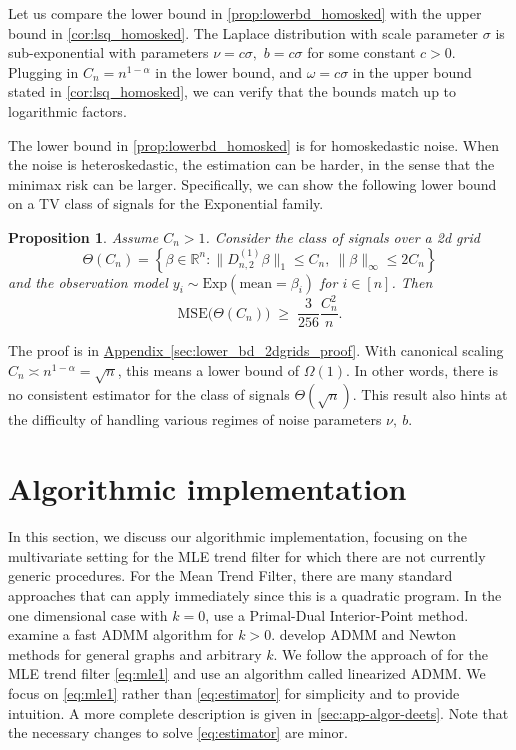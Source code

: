 \documentclass[ejs,noshowframe]{imsart}
\theoremstyle{plain}
\newtheorem{proposition}[theorem]{Proposition}
\theoremstyle{definition}
\newcommand{\aref}[1]{\hyperref[#1]{Appendix~\ref*{#1}}}
\newcommand{\R}{\mathbb{R}}
\newcommand{\E}{E}
\renewcommand{\hat}{\widehat}
\newcommand{\ktfmat}{D}
\begin{document}
Let us compare the lower bound in  \autoref{prop:lowerbd_homosked} with
the upper 
bound in 
\autoref{cor:lsq_homosked}.
The Laplace distribution with scale parameter $\sigma$ is sub-exponential with
parameters  
$\nu = c\sigma,$ $b = c\sigma$ for some constant $c>0$.
Plugging in $C_n = n^{1-\alpha}$ in the lower bound, and $\omega=c\sigma$ in the
upper bound  
stated in \autoref{cor:lsq_homosked},  we can verify that the bounds match 
up to logarithmic factors.


The lower bound in  \autoref{prop:lowerbd_homosked} is for homoskedastic noise. 
When the noise is heteroskedastic, the estimation can be harder, in the sense 
that the minimax risk can be larger.
Specifically, we can show the following lower bound on a TV class of signals 
for the Exponential family.
\begin{proposition}
\label{prop:lower_bd_2dgrids}
Assume $C_n > 1$. Consider the class of signals over a 2d grid
\begin{equation}
\Theta(C_n) 
	= \left\{ \beta \in 
		\R^n : 
	\| \ktfmat_{n,2}^{(1)} \beta \|_1 \leq C_n, \ 
	\|\beta\|_\infty \leq 2C_n
	\right\}
\end{equation}
and the observation model $y_i \sim \mathrm{Exp}(\mathrm{mean} = 
\beta_i)$ for $i\in[n]$. Then
\begin{equation}
  \mathrm{MSE}\big( \Theta(C_n) \big)
  \;\geq \;
  \frac{3}{256} \frac{C_n^2}{n}.
\end{equation}
\end{proposition}
\noindent
The proof is in \aref{sec:lower_bd_2dgrids_proof}.
With canonical scaling $C_n \asymp n^{1-\alpha} = \sqrt{n}$, this means a lower
bound of $\Omega(1)$. 
In other words, there is no consistent estimator for the class of signals
$\Theta(\sqrt{n})$.  
This result also hints at the difficulty of handling various regimes of noise
parameters $\nu,\ b.$ 

\section{Algorithmic implementation}
\label{sec:algor-impl}

In this section, we discuss our algorithmic implementation, focusing on the
multivariate setting for the MLE trend filter for which there are not currently
generic procedures. 
For the Mean Trend Filter, there are many standard approaches that can apply
immediately since this is a quadratic program. In the one dimensional case with
$k=0$, \citet{KimKoh2009} use 
a Primal-Dual Interior-Point method. \citet{RamdasTibshirani2016} examine a fast
ADMM algorithm for $k>0$. \citet{WangSharpnack2016} develop ADMM and Newton
methods for general graphs and arbitrary $k$. We follow the approach of
\citet{KhodadadiMcDonald2018} for the MLE trend filter 
\eqref{eq:mle1} and use an
algorithm called linearized ADMM. We focus on \eqref{eq:mle1} rather than
\eqref{eq:estimator} for simplicity and to provide intuition. A more complete
description is given in 
\autoref{sec:app-algor-deets}. Note that the necessary changes to solve
\eqref{eq:estimator} are minor.
\end{document}
